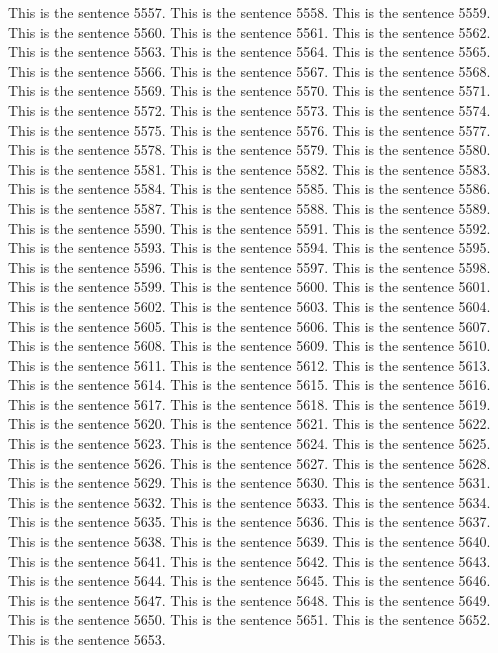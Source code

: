 \documentclass{article}
\begin{document}
This is the sentence 5557.
This is the sentence 5558.
This is the sentence 5559.
This is the sentence 5560.
This is the sentence 5561.
This is the sentence 5562.
This is the sentence 5563.
This is the sentence 5564.
This is the sentence 5565.
This is the sentence 5566.
This is the sentence 5567.
This is the sentence 5568.
This is the sentence 5569.
This is the sentence 5570.
This is the sentence 5571.
This is the sentence 5572.
This is the sentence 5573.
This is the sentence 5574.
This is the sentence 5575.
This is the sentence 5576.
This is the sentence 5577.
This is the sentence 5578.
This is the sentence 5579.
This is the sentence 5580.
This is the sentence 5581.
This is the sentence 5582.
This is the sentence 5583.
This is the sentence 5584.
This is the sentence 5585.
This is the sentence 5586.
This is the sentence 5587.
This is the sentence 5588.
This is the sentence 5589.
This is the sentence 5590.
This is the sentence 5591.
This is the sentence 5592.
This is the sentence 5593.
This is the sentence 5594.
This is the sentence 5595.
This is the sentence 5596.
This is the sentence 5597.
This is the sentence 5598.
This is the sentence 5599.
This is the sentence 5600.
This is the sentence 5601.
This is the sentence 5602.
This is the sentence 5603.
This is the sentence 5604.
This is the sentence 5605.
This is the sentence 5606.
This is the sentence 5607.
This is the sentence 5608.
This is the sentence 5609.
This is the sentence 5610.
This is the sentence 5611.
This is the sentence 5612.
This is the sentence 5613.
This is the sentence 5614.
This is the sentence 5615.
This is the sentence 5616.
This is the sentence 5617.
This is the sentence 5618.
This is the sentence 5619.
This is the sentence 5620.
This is the sentence 5621.
This is the sentence 5622.
This is the sentence 5623.
This is the sentence 5624.
This is the sentence 5625.
This is the sentence 5626.
This is the sentence 5627.
This is the sentence 5628.
This is the sentence 5629.
This is the sentence 5630.
This is the sentence 5631.
This is the sentence 5632.
This is the sentence 5633.
This is the sentence 5634.
This is the sentence 5635.
This is the sentence 5636.
This is the sentence 5637.
This is the sentence 5638.
This is the sentence 5639.
This is the sentence 5640.
This is the sentence 5641.
This is the sentence 5642.
This is the sentence 5643.
This is the sentence 5644.
This is the sentence 5645.
This is the sentence 5646.
This is the sentence 5647.
This is the sentence 5648.
This is the sentence 5649.
This is the sentence 5650.
This is the sentence 5651.
This is the sentence 5652.
This is the sentence 5653.
\end{document}
